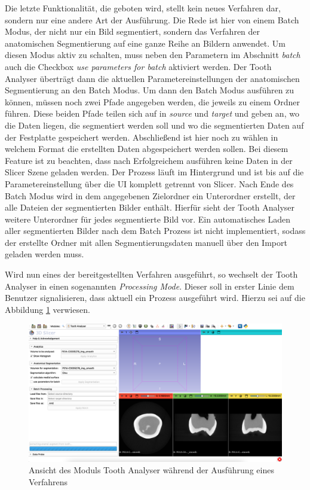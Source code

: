 Die letzte Funktionalität, die geboten wird, stellt kein neues Verfahren dar, sondern
nur eine andere Art der Ausführung. Die Rede ist hier von einem Batch Modus, der
nicht nur ein Bild segmentiert, sondern das Verfahren der anatomischen
Segmentierung auf eine ganze Reihe an Bildern anwendet. Um diesen Modus aktiv zu
schalten, muss neben den Parametern im Abschnitt \textit{batch} auch die Checkbox
\textit{use parameters for batch} aktiviert werden. Der Tooth Analyser überträgt
dann die aktuellen Parametereinstellungen der anatomischen Segmentierung an den Batch
Modus. Um dann den Batch Modus ausführen zu können, müssen noch zwei Pfade angegeben
werden, die jeweils zu einem Ordner führen. Diese beiden Pfade teilen sich auf in
\textit{source} und \textit{target} und geben an, wo die Daten liegen, die segmentiert
werden soll und wo die segmentierten Daten auf der Festplatte gespeichert werden.
Abschließend ist hier noch zu wählen in welchem Format die erstellten Daten
abgespeichert werden sollen. Bei diesem Feature ist zu beachten, dass nach
Erfolgreichem ausführen keine Daten in der Slicer Szene geladen werden. Der Prozess
läuft im Hintergrund und ist bis auf die Parametereinstellung über die \ac{UI}
komplett getrennt von Slicer. Nach Ende des Batch Modus wird in dem angegebenen Zielordner
ein Unterordner erstellt, der alle Dateien der segmentierten Bilder enthält. Hierfür
sieht der Tooth Analyser weitere Unterordner für jedes segmentierte Bild vor.
Ein automatisches Laden aller segmentierten Bilder nach dem Batch Prozess ist
nicht implementiert, sodass der erstellte Ordner mit allen Segmentierungsdaten manuell
über den Import geladen werden muss.

Wird nun eines der bereitgestellten Verfahren ausgeführt, so wechselt der Tooth
Analyser in einen sogenannten \textit{Processing Mode}. Dieser soll in erster
Linie dem Benutzer signalisieren, dass aktuell ein Prozess ausgeführt wird.
Hierzu sei auf die Abbildung \ref{fig:processing_mode} verwiesen.

\begin{figure}[h]
	\centering
	\includegraphics[scale=1, width=\textwidth]{img/processingMode.png}
	\caption{Ansicht des Moduls Tooth Analyser während der Ausführung eines
	Verfahrens}
	\label{fig:processing_mode}
\end{figure}

